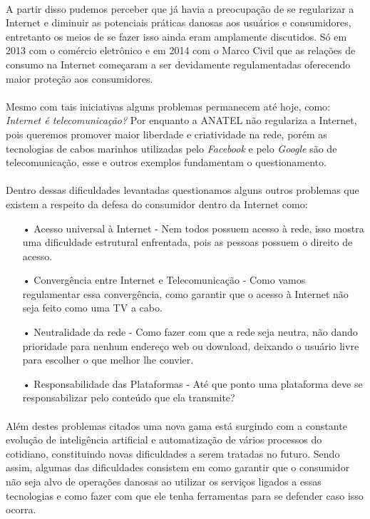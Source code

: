 \documentclass[12pt]{article}
\begin{document}
	\paragraph{}
		A partir disso pudemos perceber que já havia a preocupação de se regularizar
		a Internet e diminuir as potenciais práticas danosas aos usuários e 
		consumidores, entretanto os meios de se fazer isso ainda eram amplamente
		discutidos. Só em 2013 com o comércio eletrônico e em 2014 com o Marco
		Civil que as relações de consumo na Internet começaram a ser devidamente
		regulamentadas oferecendo maior proteção aos consumidores.
	\paragraph{}
		Mesmo com tais iniciativas alguns problemas permanecem 
		até hoje, como: \textit{Internet é telecomunicação?} Por enquanto a ANATEL
		não regulariza a Internet, pois queremos promover maior liberdade e
		criatividade na rede, porém as tecnologias de cabos marinhos utilizadas
		pelo \textit{Facebook} e pelo \textit{Google} são de telecomunicação,
		esse e outros exemplos fundamentam o questionamento.
	\paragraph{}
		Dentro dessas dificuldades levantadas questionamos alguns outros problemas
		que existem a respeito da defesa do consumidor dentro da Internet como:
		\begin{itemize}
			\item[•]
				Acesso universal à Internet - Nem todos possuem acesso à rede, isso
				mostra uma dificuldade estrutural enfrentada, pois as pessoas possuem
				o direito de acesso.
			\item[•]
				Convergência entre Internet e Telecomunicação - Como vamos 
				regulamentar essa convergência, como garantir que o acesso à
				Internet não seja feito como uma TV a cabo.
			\item[•]
				Neutralidade da rede - Como fazer com que a rede seja neutra, não
				dando prioridade para nenhum endereço web ou download, deixando
				o usuário livre para escolher o que melhor lhe convier.
			\item[•]
				Responsabilidade das Plataformas - Até que ponto uma plataforma
				deve se responsabilizar pelo conteúdo que ela transmite?				
		\end{itemize}
	\paragraph{}
		Além destes problemas citados uma nova gama está surgindo com a constante
		evolução de inteligência artificial e automatização de vários processos do
		cotidiano, constituindo novas dificuldades a serem tratadas no futuro. Sendo
		assim, algumas das dificuldades consistem em como garantir que o consumidor 
		não seja alvo de operações danosas ao utilizar os serviços ligados a essas 
		tecnologias e como fazer com que ele	tenha ferramentas para se defender 
		caso isso ocorra.
\end{document}
